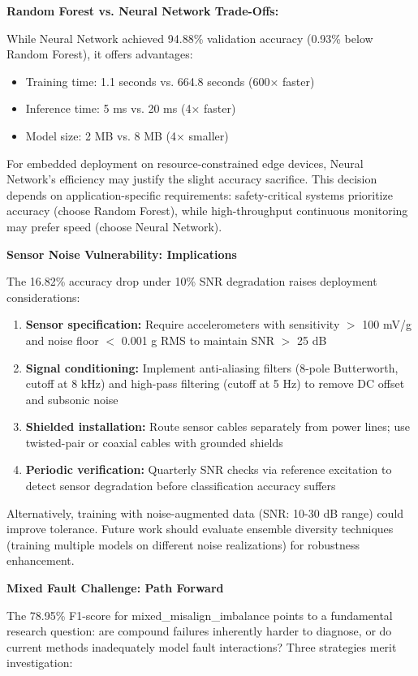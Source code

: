 \documentclass[11pt,a4paper]{article}
\begin{document}
\textbf{Random Forest vs. Neural Network Trade-Offs:}

While Neural Network achieved 94.88\% validation accuracy (0.93\% below Random Forest), it offers advantages:
\begin{itemize}[itemsep=0.2em]
    \item Training time: 1.1 seconds vs. 664.8 seconds (600× faster)
    \item Inference time: 5 ms vs. 20 ms (4× faster)
    \item Model size: 2 MB vs. 8 MB (4× smaller)
\end{itemize}

For embedded deployment on resource-constrained edge devices, Neural Network's efficiency may justify the slight accuracy sacrifice. This decision depends on application-specific requirements: safety-critical systems prioritize accuracy (choose Random Forest), while high-throughput continuous monitoring may prefer speed (choose Neural Network).

\textbf{Sensor Noise Vulnerability: Implications}

The 16.82\% accuracy drop under 10\% SNR degradation raises deployment considerations:
\begin{enumerate}[itemsep=0.3em]
    \item \textbf{Sensor specification:} Require accelerometers with sensitivity  $>$  100 mV/g and noise floor  $<$  0.001 g RMS to maintain SNR  $>$  25 dB
    \item \textbf{Signal conditioning:} Implement anti-aliasing filters (8-pole Butterworth, cutoff at 8 kHz) and high-pass filtering (cutoff at 5 Hz) to remove DC offset and subsonic noise
    \item \textbf{Shielded installation:} Route sensor cables separately from power lines; use twisted-pair or coaxial cables with grounded shields
    \item \textbf{Periodic verification:} Quarterly SNR checks via reference excitation to detect sensor degradation before classification accuracy suffers
\end{enumerate}

Alternatively, training with noise-augmented data (SNR: 10-30 dB range) could improve tolerance. Future work should evaluate ensemble diversity techniques (training multiple models on different noise realizations) for robustness enhancement.

\textbf{Mixed Fault Challenge: Path Forward}

The 78.95\% F1-score for mixed\_misalign\_imbalance points to a fundamental research question: are compound failures inherently harder to diagnose, or do current methods inadequately model fault interactions? Three strategies merit investigation:
\end{document}
